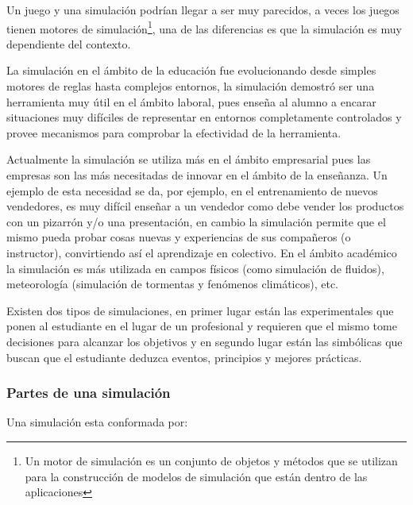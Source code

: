 Un juego y una simulación podrían llegar a ser muy parecidos, a veces los juegos
tienen motores de simulación\footnote{Un motor de simulación es un conjunto de
    objetos y métodos que se utilizan para la construcción de modelos de
    simulación que están dentro de las aplicaciones}, una de las diferencias es
que la simulación es muy dependiente del contexto. 

La simulación en el ámbito de la educación fue evolucionando desde simples
motores de reglas hasta complejos entornos, la simulación demostró ser una
herramienta muy útil en el ámbito laboral\cite{mariluz:seiousgames}, pues enseña
al alumno a encarar situaciones muy difíciles de representar en entornos
completamente controlados y provee mecanismos para comprobar la efectividad de
la herramienta. 

Actualmente la simulación se utiliza más en el ámbito empresarial pues las
empresas son las más necesitadas de innovar en el ámbito de la enseñanza. Un
ejemplo de esta necesidad se da, por ejemplo, en el entrenamiento de nuevos
vendedores, es muy difícil enseñar a un vendedor como debe vender los productos
con un pizarrón y/o una presentación, en cambio la simulación permite que el
mismo pueda probar cosas nuevas y experiencias de sus compañeros (o instructor),
convirtiendo así el aprendizaje en colectivo\cite{mariluz:seiousgames}. En el
ámbito académico la simulación es más utilizada en campos físicos (como
simulación de fluidos), meteorología (simulación de tormentas y fenómenos
climáticos), etc. 

Existen dos tipos de simulaciones, en primer lugar están las experimentales que
ponen al estudiante en el lugar de un profesional y requieren que el mismo tome
decisiones para alcanzar los objetivos y en segundo lugar están las simbólicas
que buscan que el estudiante deduzca eventos, principios y mejores
prácticas\cite{charsky:2010}. 


\subsubsection{Partes de una simulación}

Una simulación esta conformada por:

